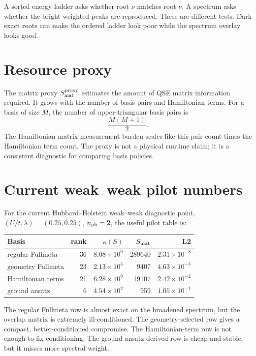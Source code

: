 \documentclass[10pt,twocolumn]{article}
\begin{document}
A sorted energy ladder asks whether root \(\nu\) matches root \(\nu\).  A spectrum asks whether the bright weighted peaks are reproduced.  These are different tests.  Dark exact roots can make the ordered ladder look poor while the spectrum overlay looks good.

\section{Resource proxy}
The matrix proxy \(S_{\rm mat}^{\rm proxy}\) estimates the amount of QSE matrix information required.  It grows with the number of basis pairs and Hamiltonian terms.  For a basis of size \(M\), the number of upper-triangular basis pairs is
\begin{equation}
  \frac{M(M+1)}{2}.
\end{equation}
The Hamiltonian matrix measurement burden scales like this pair count times the Hamiltonian term count.  The proxy is not a physical runtime claim; it is a consistent diagnostic for comparing basis policies.

\section{Current weak--weak pilot numbers}
For the current Hubbard--Holstein weak--weak diagnostic point, \((U/t,\lambda)=(0.25,0.25)\), \(n_{\rm ph}=2\), the useful pilot table is:
\begin{center}
\scriptsize
\begin{tabular}{lrrrr}
\toprule
Basis & rank & \(\kappa(S)\) & \(S_{\rm mat}\) & L2\\
\midrule
regular Fullmeta & 36 & \(8.08{\times}10^9\) & 289640 & \(2.31{\times}10^{-8}\)\\
geometry Fullmeta & 23 & \(2.13{\times}10^3\) & 9407 & \(4.63{\times}10^{-3}\)\\
Hamiltonian terms & 21 & \(6.28{\times}10^9\) & 19107 & \(2.42{\times}10^{-2}\)\\
ground ansatz & 6 & \(4.54{\times}10^2\) & 959 & \(1.05{\times}10^{-1}\)\\
\bottomrule
\end{tabular}
\end{center}
The regular Fullmeta row is almost exact on the broadened spectrum, but the overlap matrix is extremely ill-conditioned.  The geometry-selected row gives a compact, better-conditioned compromise.  The Hamiltonian-term row is not enough to fix conditioning.  The ground-ansatz-derived row is cheap and stable, but it misses more spectral weight.
\end{document}
